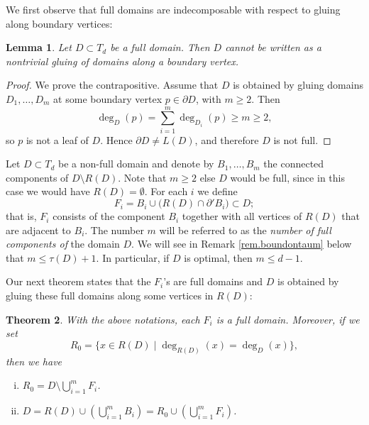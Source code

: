 \documentclass[a4paper, 11pt]{article}
\numberwithin{equation}{section}
\newtheorem{theorem}{Theorem}[section]
\newtheorem{lemma}[theorem]{Lemma}
\theoremstyle{definition}
\theoremstyle{remark}
\begin{document}
We first observe that full domains  are  indecomposable with respect to gluing  along boundary vertices:
\begin{lemma}\label{lem:full-no-boundary-gluing}
Let $D\subset T_d$ be a full domain.  Then $D$ cannot be written as a nontrivial gluing of domains along a boundary vertex.
\end{lemma}

\begin{proof}
We prove the contrapositive.  Assume that $D$ is obtained by gluing domains $D_1,\dots,D_m$ at some boundary vertex $p\in\partial D$, with $m\ge 2$.
Then
\[
\deg_D(p)=\sum_{i=1}^m \deg_{D_i}(p)\ge m\ge 2,
\]
so $p$ is not a leaf of $D$. Hence $\partial D\neq L(D)$, and therefore $D$ is not full.
\end{proof}


\medskip



Let $D\subset T_d$ be a non-full domain and denote by $B_1,\dots,B_m$ the connected components of $D\setminus R(D)$.  
Note that $m \geq 2$ else $D$ would be full, since in this case we would have $R(D) = \emptyset$.  For each $i$ we define
\begin{equation}\label{eq:def-Fi}
F_i  =  B_i \cup \bigl(R(D)\cap \partial' B_i\bigr)\subset D; 
\end{equation}
that is, $F_i$ consists of the component $B_i$ together with all vertices of $R(D)$ that are adjacent to $B_i$.
The number $m$ will be referred to as the \textit{number of full components of}  the domain $D$.  We will see in Remark \ref{rem.boundontaum} below that $m \leq  \tau(D) +1$. In particular, if $D$ is optimal, then  $m \leq d-1$.

\medskip  \newpage 

Our next theorem states that the $F_i$'s are full domains and $D$ is obtained by gluing these full domains along some vertices in $R(D)$:
\begin{theorem}\label{th.dec}
With the above notations, each $F_i$ is a full domain.  
Moreover, if we set
\[
   R_0  =  \{x\in R(D) \mid \deg_{R(D)}(x)=\deg_D(x)\},
\]
then we have
\begin{enumerate}[(i)]
 \item $R_0 = D \setminus \bigcup_{i=1}^m F_i$.
 \item $D =  R(D) \cup \left( \bigcup_{i=1}^m B_i \right) 
  =  R_0 \cup \left( \bigcup_{i=1}^m F_i \right)$.
\end{enumerate}
\end{theorem}
\end{document}
